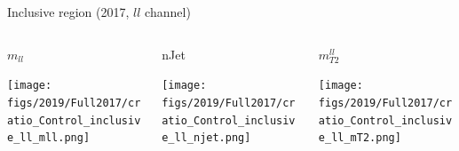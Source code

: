 \documentclass[9pt]{beamer}
\begin{document}
\begin{frame}{Inclusive region (2017, $ll$ channel)}
\begin{columns}
		\begin{column}{0.32\textwidth}
			\begin{center}
			\begin{block}{\centering $m_{ll}$}\end{block}	
     			\texttt{[image: figs/2019/Full2017/cratio\_Control\_inclusive\_ll\_mll.png]}
    		\end{center}		
		\end{column} \hfill
		\begin{column}{0.32\textwidth}
			\begin{center}
				\begin{block}{\centering nJet}\end{block}
     			\texttt{[image: figs/2019/Full2017/cratio\_Control\_inclusive\_ll\_njet.png]}
    		\end{center}		
		\end{column} \hfill
		\begin{column}{0.32\textwidth}
			\begin{center}
				\begin{block}{\centering $m_{T2}^{ll}$}\end{block}
     			\texttt{[image: figs/2019/Full2017/cratio\_Control\_inclusive\_ll\_mT2.png]}
   			 \end{center}
		\end{column} \hfill
	\end{columns}
\end{frame}
\end{document}
